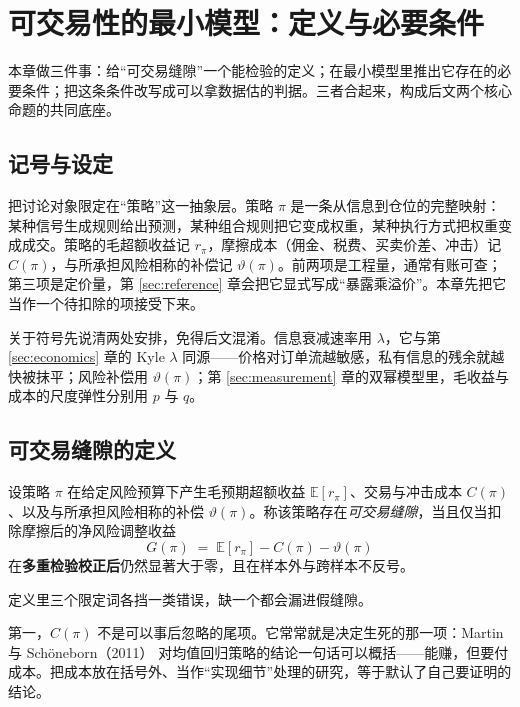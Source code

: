 \section{可交易性的最小模型：定义与必要条件}\label{sec:definition}

本章做三件事：给“可交易缝隙”一个能检验的定义；在最小模型里推出它存在的必要条件；把这条条件改写成可以拿数据估的判据。三者合起来，构成后文两个核心命题的共同底座。

\subsection{记号与设定}

把讨论对象限定在“策略”这一抽象层。策略 $\pi$ 是一条从信息到仓位的完整映射：某种信号生成规则给出预测，某种组合规则把它变成权重，某种执行方式把权重变成成交。策略的毛超额收益记 $r_\pi$，摩擦成本（佣金、税费、买卖价差、冲击）记 $C(\pi)$，与所承担风险相称的补偿记 $\vartheta(\pi)$。前两项是工程量，通常有账可查；第三项是定价量，第 \ref{sec:reference} 章会把它显式写成“暴露乘溢价”。本章先把它当作一个待扣除的项接受下来。

关于符号先说清两处安排，免得后文混淆。信息衰减速率用 $\lambda$，它与第 \ref{sec:economics} 章的 Kyle $\lambda$ 同源——价格对订单流越敏感，私有信息的残余就越快被抹平；风险补偿用 $\vartheta(\pi)$；第 \ref{sec:measurement} 章的双幂模型里，毛收益与成本的尺度弹性分别用 $p$ 与 $q$。

\subsection{可交易缝隙的定义}

\begin{definition}[可交易缝隙]\label{def:gap}
设策略 $\pi$ 在给定风险预算下产生毛预期超额收益 $\mathbb{E}[r_\pi]$、交易与冲击成本 $C(\pi)$、以及与所承担风险相称的补偿 $\vartheta(\pi)$。称该策略存在\emph{可交易缝隙}，当且仅当扣除摩擦后的净风险调整收益
\begin{equation}
  G(\pi) \;=\; \mathbb{E}[r_\pi] - C(\pi) - \vartheta(\pi)
  \label{eq:G}
\end{equation}
在\textbf{多重检验校正后}仍然显著大于零，且在样本外与跨样本不反号。
\end{definition}

定义里三个限定词各挡一类错误，缺一个都会漏进假缝隙。

第一，$C(\pi)$ 不是可以事后忽略的尾项。它常常就是决定生死的那一项：Martin 与 Sch\"oneborn（2011）\cite{martin2011} 对均值回归策略的结论一句话可以概括——能赚，但要付成本。把成本放在括号外、当作“实现细节”处理的研究，等于默认了自己要证明的结论。

